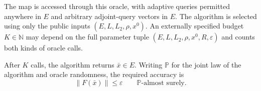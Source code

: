 \documentclass[10pt]{article}
\theoremstyle{definition}
\begin{document}
The map is accessed through this oracle, with adaptive queries permitted anywhere in $E$ and arbitrary adjoint-query vectors in $E$. The algorithm is selected using only the public inputs $(E,L,L_2,\rho,x^0)$. An externally specified budget $K\in\mathbb{N}$ may depend on the full parameter tuple $(E,L,L_2,\rho,x^0,R,\varepsilon)$ and counts both kinds of oracle calls.

After $K$ calls, the algorithm returns $\bar{x}\in E$. Writing $\mathbb{P}$ for the joint law of the algorithm and oracle randomness, the required accuracy is
\[
\|F(\bar{x})\|\leq\varepsilon
\qquad\mathbb{P}\text{-almost surely}.
\]
\end{document}
